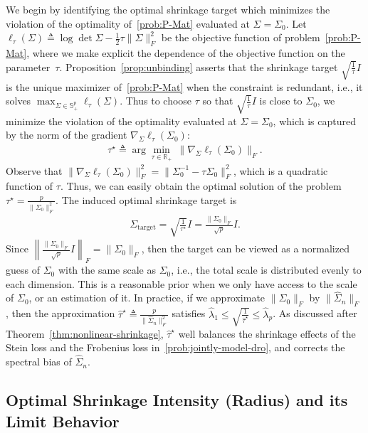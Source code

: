 \documentclass[11pt]{article}
\def\R{\mathbb{R}}
\def\S{\mathbb{S}}
\def\PSD{{\S^k_{++}}}
\newcommand{\opt}{^\star}
\newcommand{\Let}{\triangleq}
\def\R{\mathbb{R}}
\def\S{\mathbb{S}}
\def\PSD{{\S^p_{+}}}
\newcommand{\wh}{\widehat}
\begin{document}
We begin by identifying the optimal shrinkage target which minimizes the violation of the optimality of~\eqref{prob:P-Mat} evaluated at $\Sigma=\Sigma_0$. Let $\ell_\tau(\Sigma) \Let \log\det \Sigma - \frac{1}{2}\tau\|\Sigma\|_F^2$ be the objective function of problem~\eqref{prob:P-Mat}, where we make explicit the dependence of the objective function on the parameter~$\tau$.
Proposition~\ref{prop:unbinding} asserts that the shrinkage target $\sqrt{\frac{1}{\tau}}I$ is the unique maximizer of~\eqref{prob:P-Mat} when the constraint is redundant, i.e., it solves $\max_{\Sigma\in\PSD}\ell_\tau(\Sigma)$. Thus to choose $\tau$ so that $\sqrt{\frac{1}{\tau}}I$ is close to $\Sigma_0$, we minimize the violation of the optimality evaluated at $\Sigma=\Sigma_0$, which is captured by the norm of the gradient $\nabla_{\Sigma} \ell_\tau(\Sigma_0)$:
\begin{align}\label{prob:opt-tau}
    \tau\opt\Let\arg\min_{\tau \in \R_{+}}~\| \nabla_{\Sigma} \ell_\tau(\Sigma_0)  \|_F.
\end{align}
Observe that $\|\nabla_{\Sigma} \ell_\tau(\Sigma_0)\|_F^2 = \|\Sigma_0^{-1}-\tau\Sigma_0\|_F^2$, which is a quadratic function of $\tau$. Thus, we can easily obtain the optimal solution of the problem $\tau\opt= \frac{p}{\|\Sigma_0\|_F^2}$.
The induced optimal shrinkage target is
\begin{align}\label{eq:optimal-target}
    \Sigma_{\text{target}}=\sqrt{\frac{1}{\tau\opt}}I=\frac{\|\Sigma_0\|_F}{\sqrt{p}}I.
\end{align}
Since $\left\|\frac{\|\Sigma_0\|_F}{\sqrt{p}}I\right\|_F=\|\Sigma_0\|_F$, then the target can be viewed as a normalized guess of $\Sigma_0$ with the same scale as $\Sigma_0$, i.e., the total scale is distributed evenly to each dimension. 
This is a reasonable prior when we only have access to the scale of $\Sigma_0$, or an estimation of it.
In practice, if we approximate $\|\Sigma_0\|_F$ by $\|\wh\Sigma_n\|_F$, then the approximation $\wh{\tau}\opt\Let \frac{p}{\|\wh\Sigma_n\|_F^2}$ satisfies $\wh\lambda_1\leq\sqrt{\frac{1}{\wh{\tau}\opt}}\leq \wh\lambda_p$. As discussed after Theorem~\ref{thm:nonlinear-shrinkage}, $\wh{\tau}\opt$ well balances the shrinkage effects of the Stein loss and the Frobenius loss in~\eqref{prob:jointly-model-dro}, and corrects the spectral bias of $\wh\Sigma_n$.


\subsection{Optimal Shrinkage Intensity (Radius) and its Limit Behavior}\label{sec:opt-radius}
\end{document}
